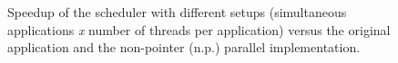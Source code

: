 \begin{figure}[!htp]
	\begin{center}
		\caption{Speedup of the scheduler with different setups (simultaneous applications \textit{x} number of threads per application) versus the original application and the non-pointer (n.p.) parallel implementation.}
		\label{fig:SchedulerSpeedups}
	\end{center}
\end{figure}

